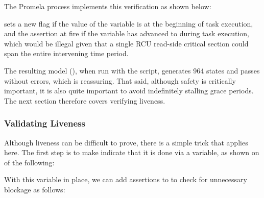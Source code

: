 The  Promela process implements
this verification as shown below:



\begin{fcvref}
 sets a new  flag if the
value of the  variable is
 at the beginning of task execution,
and the assertion at 
fire if the 
variable has advanced to  during task execution,
which would be illegal given that a single RCU read-side critical
section could span the entire intervening time period.
\end{fcvref}

The resulting
model (),
when run with the  script,
generates 964 states and passes without errors, which is reassuring.
That said, although safety is critically important, it is also quite
important to avoid indefinitely stalling grace periods.
The next section therefore covers verifying liveness.

\subsubsection{Validating Liveness}
\label{sec:formal:Validating Liveness}

\begin{fcvref}
Although liveness can be difficult to prove, there is a simple
trick that applies here.
The first step is to make  indicate that
it is done via a  variable, as shown on
 of the following:
\end{fcvref}



With this variable in place, we can add assertions to
 to check for unnecessary blockage
as follows:



